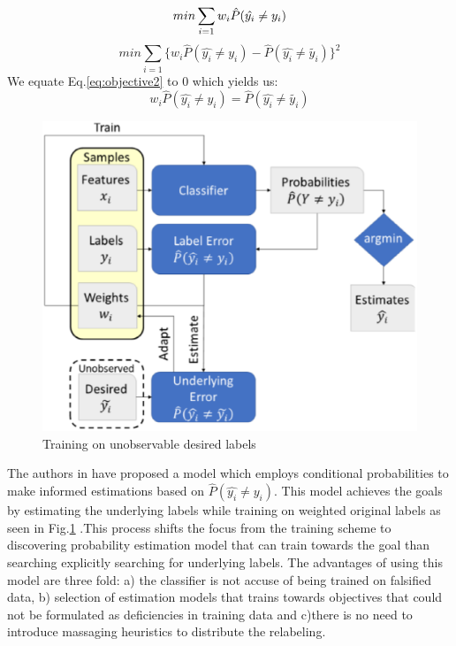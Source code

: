 \documentclass[runningheads]{llncs}
\begin{document}
\begin{equation}
min\sum_{i=1}{w_i\hat{P}(\hat{y_i} \ne y_i)} \\
\label{eq:objective1}
\end{equation}
\begin{equation}
min\sum_{i=1}{\{w_i\hat{P}(\hat{y_i} \ne y_i) - \hat{P}(\hat{y_i} \ne \tilde{y_i})}\}^2 
\label{eq:objective2}
\end{equation}
We equate Eq.\ref{eq:objective2} to 0 which yields us:
\begin{equation}
w_i\hat{P}(\hat{y_i} \ne y_i) = \hat{P}(\hat{y_i} \ne \tilde{y_i})
\label{eq:objective2}
\end{equation}
\begin{figure}[H]
  \centering
  \includegraphics[width=0.5\linewidth]{img/Fig3.eps}
  \caption{Training on unobservable desired labels}
  \label{fig:unobservelabels}
\end{figure}
The authors in \cite{krasanakis2018adaptive} have proposed a model which employs conditional probabilities to make informed estimations based on $\hat{P}(\hat{y_i} \ne y_i)$. This model achieves the goals by estimating the underlying labels while training on weighted original labels as seen in Fig.\ref{fig:unobservelabels} .This process shifts the focus from the training scheme to discovering probability estimation model that can train towards the goal than searching explicitly searching for underlying labels. The advantages of using this model are three fold: a) the classifier is not accuse of being trained on falsified data, b) selection of estimation models that trains towards objectives that could not be formulated as deficiencies in training data and c)there is no need to introduce massaging heuristics to distribute the relabeling.\\
\end{document}
